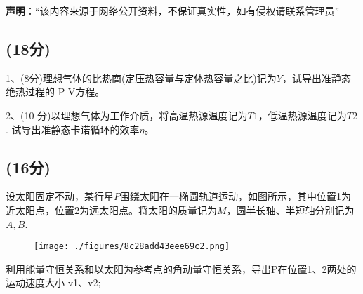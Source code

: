 
\textbf{声明}：“该内容来源于网络公开资料，不保证真实性，如有侵权请联系管理员”

\subsection{(18分)}
1、(8分)理想气体的比热商(定压热容量与定体热容量之比)记为$Y$，试导出准静态绝热过程的 P-V方程。

2、(10 分)以理想气体为工作介质，将高温热源温度记为$T1$，低温热源温度记为$T2$.
试导出准静态卡诺循环的效率$\eta$。
\subsection{(16分)}
设太阳固定不动，某行星$P$围绕太阳在一椭圆轨道运动，如图所示，其中位置1为近太阳点，位置2为远太阳点。将太阳的质量记为$M$，圆半长轴、半短轴分别记为$A,B$.
\begin{figure}[ht]
\centering
\texttt{[image: ./figures/8c28add43eee69c2.png]}
\caption{} \label{fig_PKU200_1}
\end{figure}
利用能量守恒关系和以太阳为参考点的角动量守恒关系，导出P在位置1、2两处的运动速度大小 v1、v2;